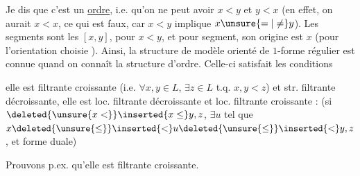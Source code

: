 
Je dis que c'est un \uline{ordre}, i.e. qu'on ne peut avoir $x<y$ et $y<x$ (en effet, on aurait $x<x$, ce qui est faux, car $x<y$ implique $x\unsure{=|\ne}y$). Les segments sont les $[x,y]$, pour $x<y$, et pour   segment, son origine est $x$ (pour l'orientation choisie ). Ainsi, la structure de modèle  orienté de $1$-forme régulier est connue quand on connaît la structure d'ordre. Celle-ci  satisfait les conditions

elle est  filtrante croissante (i.e. $\forall x,y\in L$, $\exists z\in L$ t.q. $x,y<z$) et str. filtrante décroissante, elle est  loc. filtrante décroissante et loc. filtrante  croissante : (si $\deleted{\unsure{x<}}\inserted{x\leq}y,z$, $\exists u$ tel que $x\deleted{\unsure{\leq}}\inserted{<}u\deleted{\unsure{\leq}}\inserted{<}y,z$, et forme duale)



Prouvons p.ex. qu'elle est  filtrante croissante.



